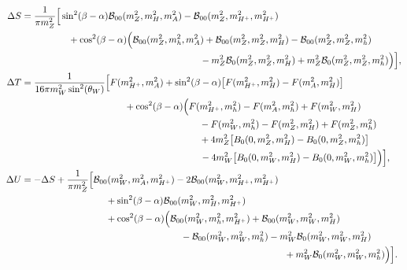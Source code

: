 \documentclass[preprint,3p,12pt]{elsarticle}
\begin{document}
\begin{align}
 \Delta S &= \frac{1}{\pi m_Z^2} \Big[ \sin^2 (\beta-\alpha ) {\cal B}_{00}(m_Z^2,m_H^2,m_A^2) - {\cal B}_{00}(m_Z^2,m_{H^+}^2,m_{H^+}^2) \phantom{\Big]} \nonumber \\
 & \hspace*{50pt} + \cos^2 (\beta-\alpha ) \Big( {\cal B}_{00}(m_Z^2,m_h^2,m_A^2) + {\cal B}_{00}(m_Z^2,m_Z^2,m_H^2) - {\cal B}_{00}(m_Z^2,m_Z^2,m_h^2) \phantom{\Big)} \nonumber \\
 & \phantom{\Big[} \phantom{\Big(} \hspace*{180pt} - m_Z^2 {\cal B}_0(m_Z^2,m_Z^2,m_H^2) + m_Z^2 {\cal B}_0(m_Z^2,m_Z^2,m_h^2) \Big) \Big] ,\nonumber \\
\Delta T &= \frac{1}{16\pi m_W^2 \sin^2 (\theta_W)} \Big[ F(m_{H^+}^2,m_A^2) + \sin^2 (\beta -\alpha ) \big[ F(m_{H^+}^2,m_H^2) - F(m_A^2,m_H^2)\big] \phantom{\Big]} \nonumber \\
 & \hspace*{110pt} + \cos^2 (\beta-\alpha ) \Big( F(m_{H^+}^2,m_h^2) - F(m_A^2,m_h^2) + F(m_W^2,m_H^2) \phantom{\Big)} \nonumber \\
 & \hspace*{190pt} - F(m_W^2,m_h^2) - F(m_Z^2,m_H^2) + F(m_Z^2,m_h^2) \nonumber \\
 & \hspace*{190pt} + 4 m_Z^2 \big[ B_0(0,m_Z^2,m_H^2) - B_0(0,m_Z^2,m_h^2)\big] \nonumber \\
 & \phantom{\Big[} \phantom{\Big(} \hspace*{180pt} - 4 m_W^2 \big[ B_0(0,m_W^2,m_H^2) - B_0(0,m_W^2,m_h^2)\big] \Big) \Big] ,\nonumber \\
\Delta U &= - \Delta S + \frac{1}{\pi m_Z^2} \Big[ {\cal B}_{00}(m_W^2,m_A^2,m_{H^+}^2) - 2 {\cal B}_{00}(m_W^2,m_{H^+}^2,m_{H^+}^2) \phantom{\Big]} \nonumber \\
 & \hspace*{90pt} + \sin^2 (\beta -\alpha ) {\cal B}_{00}(m_W^2,m_H^2,m_{H^+}^2) \nonumber \\
 & \hspace*{90pt} + \cos^2 (\beta-\alpha ) \Big( {\cal B}_{00}(m_W^2,m_h^2,m_{H^+}^2) + {\cal B}_{00}(m_W^2,m_W^2,m_H^2) \phantom{\Big)} \nonumber \\
 & \hspace*{170pt} - {\cal B}_{00}(m_W^2,m_W^2,m_h^2) - m_W^2 {\cal B}_0(m_W^2,m_W^2,m_H^2) \nonumber \\
 & \phantom{\Big[} \phantom{\Big(} \hspace*{270pt} + m_W^2 {\cal B}_0(m_W^2,m_W^2,m_h^2) \Big) \Big] .\nonumber
\end{align}
\end{document}
